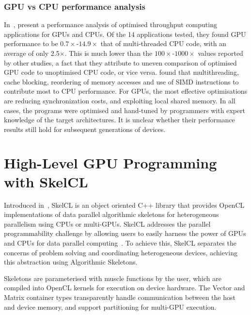 
\subsubsection{GPU vs CPU performance analysis}

In~\cite{Lee2010}, \citeauthor{Lee2010} present a performance analysis
of optimised throughput computing applications for GPUs and CPUs. Of
the 14 applications tested, they found GPU performance to be
$0.7\times$-$14.9\times$ that of multi-threaded CPU code, with an
average of only 2.5$\times$. This is much lower than the
$100\times$-$1000\times$ values reported by other studies,
a fact that they attribute to uneven comparison of optimised GPU code
to unoptimised CPU code, or vice versa. \citeauthor{Lee2010} found
that multithreading, cache blocking, reordering of memory accesses and
use of SIMD instructions to contribute most to CPU performance. For
GPUs, the most effective optimisations are reducing synchronization
costs, and exploiting local shared memory. In all cases, the programs
were optimised and hand-tuned by programmers with expert knowledge of
the target architectures. It is unclear whether their performance
results still hold for subsequent generations of devices.


\section{High-Level GPU Programming with SkelCL}\label{sec:skelcl-intro}

Introduced in~\cite{Steuwer2011}, SkelCL is an object oriented C++
library that provides OpenCL implementations of data parallel
algorithmic skeletons for heterogeneous parallelism using CPUs or
multi-GPUs. SkelCL addresses the parallel programmability challenge by
allowing users to easily harness the power of GPUs and CPUs for data
parallel computing~\cite{Steuwer2011}. To achieve this, SkelCL
separates the concerns of problem solving and coordinating
heterogeneous devices, achieving this abstraction using Algorithmic
Skeletons.

Skeletons are parameterised with muscle functions by the user, which
are compiled into OpenCL kernels for execution on device hardware. The
Vector and Matrix container types transparently handle communication
between the host and device memory, and support partitioning for
multi-GPU execution.

